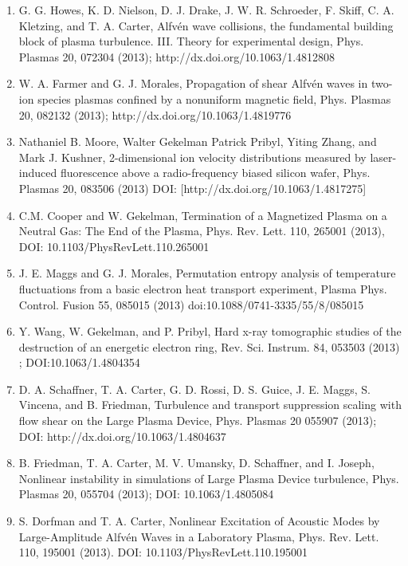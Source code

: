 \documentclass[11pt]{article}
\begin{document}
\begin{enumerate}
\item  G. G. Howes, K. D. Nielson, D. J. Drake, J. W. R. Schroeder, F. Skiff, C. A. Kletzing, and T. A. Carter, Alfv\'{e}n wave collisions, the fundamental building block of plasma turbulence. III. Theory for experimental design, Phys. Plasmas 20, 072304 (2013); http://dx.doi.org/10.1063/1.4812808

\item  W. A. Farmer and G. J. Morales, Propagation of shear Alfv\'{e}n waves in two-ion species plasmas confined by a nonuniform magnetic field, Phys. Plasmas 20, 082132 (2013); http://dx.doi.org/10.1063/1.4819776

\item   Nathaniel B. Moore, Walter Gekelman Patrick Pribyl, Yiting Zhang, and Mark J. Kushner, 2-dimensional ion velocity distributions measured by laser-induced fluorescence above a radio-frequency biased silicon wafer, Phys. Plasmas  20, 083506 (2013) DOI: [http://dx.doi.org/10.1063/1.4817275]

\item  C.M. Cooper and W. Gekelman, Termination of a Magnetized Plasma on a Neutral Gas: The End of the Plasma, Phys. Rev. Lett. 110, 265001 (2013), DOI: 10.1103/PhysRevLett.110.265001

\item   J. E. Maggs and G. J. Morales, Permutation entropy analysis of temperature fluctuations from a basic electron heat transport experiment, Plasma Phys. Control. Fusion 55, 085015 (2013) doi:10.1088/0741-3335/55/8/085015

\item  Y. Wang, W. Gekelman, and P. Pribyl, Hard x-ray tomographic studies of the destruction of an energetic electron ring, Rev. Sci. Instrum. 84, 053503 (2013) ; DOI:10.1063/1.4804354

\item   D. A. Schaffner, T. A. Carter, G. D. Rossi, D. S. Guice, J. E. Maggs, S. Vincena, and B. Friedman, Turbulence and transport suppression scaling with flow shear on the Large Plasma Device, Phys. Plasmas 20 055907 (2013); DOI: http://dx.doi.org/10.1063/1.4804637

\item   B. Friedman, T. A. Carter, M. V. Umansky, D. Schaffner, and I. Joseph, Nonlinear instability in simulations of Large Plasma Device turbulence, Phys. Plasmas 20, 055704 (2013); DOI: 10.1063/1.4805084

\item  S. Dorfman and T. A. Carter, Nonlinear Excitation of Acoustic Modes by Large-Amplitude Alfv\'{e}n Waves in a Laboratory Plasma, Phys. Rev. Lett. 110, 195001 (2013). DOI: 10.1103/PhysRevLett.110.195001


\end{enumerate}
\end{document}
